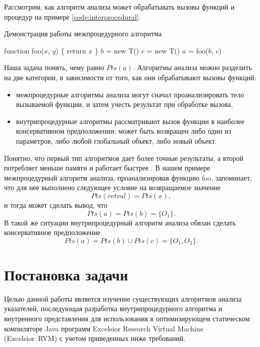 \documentclass[14pt,titlepage]{extarticle}
\newcommand{\eng}[1]{{\English#1}}
\begin{document}
    Рассмотрим, как алгоритм анализа может обрабатывать вызовы
    функций и процедур на примере \ref{code:interprocedural}.
    \begin{algorithm}
      \caption{Демонстрация работы межпроцедурного алгоритма}
      \label{code:interprocedural}
      \begin{algorithmic}[1]
        \STATE function foo($x$, $y$) \{ return $x$ \}
        \STATE $b$ = new T()
        \STATE $c$ = new T()
        \STATE $a$ = foo($b$, $c$)
      \end{algorithmic}
    \end{algorithm}
    Наша задача понять, чему равно $Pts(a)$.
    Алгоритмы анализа можно разделить на две категории, в зависимости от того,
    как они обрабатывают вызовы функций:
    \begin{itemize}
      \item межпроцедурные алгоритмы анализа могут сначал проанализировать
            тело вызываемой функции, и затем учесть результат при обработке
            вызова,
      \item внутрипроцедурные алгоритмы рассматривают вызов функции в наиболее
            консервативном предположении: может быть возвращен либо один из
            параметров, либо любой глобальный объект, либо новый объект.
    \end{itemize}
    Понятно, что первый тип алгоритмов дает более точные результаты,
    а второй потребляет меньше памяти и работает быстрее
    \cite[с.~117]{andersen}.
    В нашем примере межпроцедурный алгоритм анализа, проанализировав функцию
    foo, запоминает, что для нее выполнено следующее условие на возвращаемое
    значение
    \[Pts(retval) = Pts(x),\]
    и тогда может сделать вывод, что \[Pts(a) = Pts(b) = \{O_1\}.\]
    В такой же ситуации внутрипроцедурный алгоритм анализа обязан сделать
    консервативное предположение
    \[Pts(a) = Pts(b) \cup Pts(c) = \{O_1, O_2\}.\]

  \newpage
  \section{Постановка задачи}

    Целью данной работы является изучение существующих алгоритмов анализа
    указателей, последующая разработка внутрипроцедурного алгоритма и
    внутренного представления для использования в оптимизирующем
    статическом компиляторе Java программ
    \eng{Excelsior Research Virtual Machine (Excelsior~RVM)}
    с учетом приведенных ниже требований.
\end{document}
